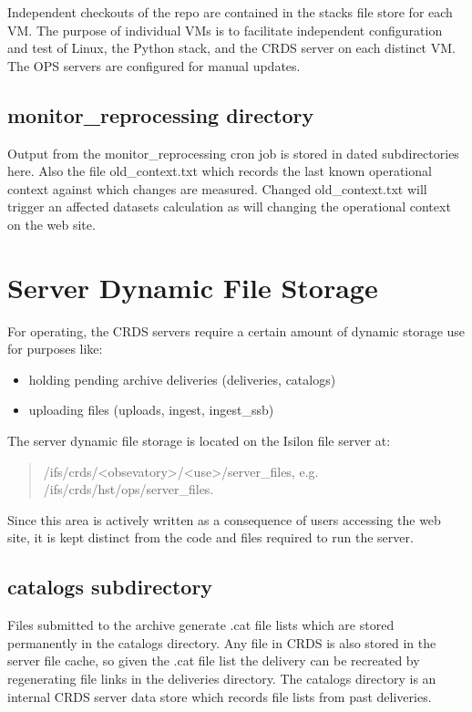 \documentclass[letterpaper,10pt,english]{sphinxmanual}
\begin{document}
Independent checkouts of the repo are contained in the stacks file store for each VM. The purpose of individual VMs is
to facilitate independent configuration and test of Linux, the Python stack, and the CRDS server on each distinct VM.
The OPS servers are configured for manual updates.


\subsection{monitor\_reprocessing directory}
\label{server_guide:monitor-reprocessing-directory}
Output from the monitor\_reprocessing cron job is stored in dated subdirectories here.  Also the file old\_context.txt
which records the last known operational context against which changes are measured.  Changed old\_context.txt will
trigger an affected datasets calculation as will changing the operational context on the web site.


\section{Server Dynamic File Storage}
\label{server_guide:server-dynamic-file-storage}
For operating,  the CRDS servers require a certain amount of dynamic storage use for purposes like:
\begin{itemize}
\item {} 
holding pending archive deliveries  (deliveries, catalogs)

\item {} 
uploading files (uploads, ingest, ingest\_ssb)

\end{itemize}

The server dynamic file storage is located on the Isilon file server at:
\begin{quote}

/ifs/crds/\textless{}obsevatory\textgreater{}/\textless{}use\textgreater{}/server\_files,    e.g. /ifs/crds/hst/ops/server\_files.
\end{quote}

Since this area is actively written as a consequence of users accessing the web site,  it is kept distinct from the
code and files required to run the server.


\subsection{catalogs subdirectory}
\label{server_guide:catalogs-subdirectory}
Files submitted to the archive generate .cat file lists which are stored permanently in the catalogs directory.
Any file in CRDS is also stored in the server file cache,  so given the .cat file list the delivery can be recreated
by regenerating file links in the deliveries directory.  The catalogs directory is an internal CRDS server data store
which records file lists from past deliveries.
\end{document}
